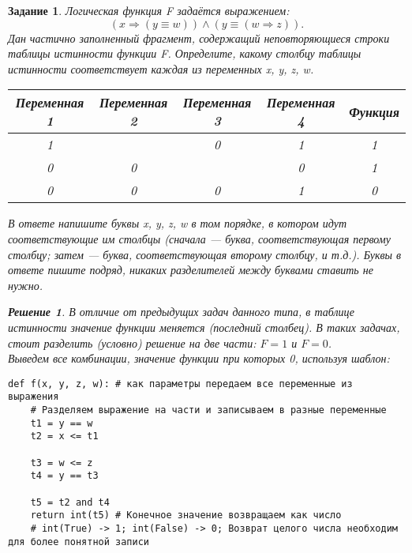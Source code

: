 \documentclass[12pt]{article}
\theoremstyle{problem_style}
\newtheorem{problem}{Задание}[subsection]
\newtheorem{solution}{Решение}[subsection]
\begin{document}
\begin{problem}
Логическая функция F задаётся выражением:
\[(x \Rightarrow (y \equiv w)) \land (y \equiv (w \Rightarrow z)).\]
Дан частично заполненный фрагмент, содержащий неповторяющиеся строки таблицы истинности функции F.
Определите, какому столбцу таблицы истинности соответствует каждая из переменных x, y, z, w.
\begin{table}[H]
    \centering
    \begin{tabular}{|c|c|c|c|c|}
        \hline
        \textbf{Переменная 1} & \textbf{Переменная 2} & \textbf{Переменная 3} & \textbf{Переменная 4} & \textbf{Функция} \\
        \hline
         1 &  & 0 & 1 & 1 \\
        \hline
         0 & 0 &  & 0 & 1 \\
        \hline
         0 & 0 & 0 & 1 & 0 \\
        \hline
    \end{tabular}
\end{table}
В ответе напишите буквы x, y, z, w в том порядке, в котором идут соответствующие им столбцы (сначала — буква, соответствующая первому столбцу; затем  — буква, соответствующая второму столбцу, и т.д.). Буквы в ответе пишите подряд, никаких разделителей между буквами ставить не нужно.
\begin{solution}
В отличие от предыдущих задач данного типа, в таблице истинности значение функции меняется (последний столбец). В таких задачах, стоит разделить (условно) решение на две части: $F=1$ и $F=0$.\\
Выведем все комбинации, значение функции при которых 0, используя шаблон:
\begin{verbatim}
def f(x, y, z, w): # как параметры передаем все переменные из выражения
    # Разделяем выражение на части и записываем в разные переменные
    t1 = y == w
    t2 = x <= t1
    
    t3 = w <= z
    t4 = y == t3
    
    t5 = t2 and t4
    return int(t5) # Конечное значение возвращаем как число
    # int(True) -> 1; int(False) -> 0; Возврат целого числа необходим для более понятной записи


\end{verbatim}
\end{solution}
\end{problem}
\end{document}
